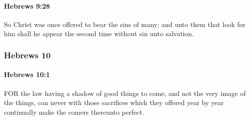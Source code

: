 		\paragraph{Hebrews 9:28} %
			\label{HEBREWS-9-28}

			So Christ was once offered to bear the sins of many; and unto them that look for him shall he appear the second time without sin unto salvation.

			\begin{framed}
			\scriptsize
				\begin{compactdesc}
					\item[SBLG] 
				\end{compactdesc}
			\end{framed}

	\subsubsection{Hebrews 10} %
		\label{HEBREWS-10}
		
		\paragraph{Hebrews 10:1} %
			\label{HEBREWS-10-1}

			FOR the law having a shadow of good things to come, and not the very image of the things, can never with those sacrifices which they offered year by year continually make the comers thereunto perfect.

